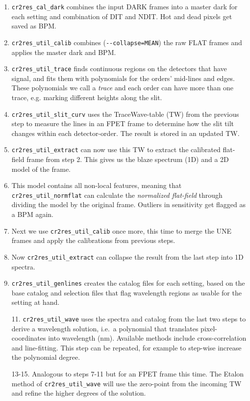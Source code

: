 \begin{enumerate}
    \item \texttt{cr2res\_cal\_dark} combines the input DARK frames into a
    master dark for each setting and combination of DIT and NDIT. Hot and dead
    pixels get saved as BPM.
    \item \texttt{cr2res\_util\_calib} combines (\verb!--collapse=MEAN!)
    the raw FLAT frames and applies the	master dark and BPM.
    \item \texttt{cr2res\_util\_trace} finds continuous regions on the detectors
    that have signal, and fits them with polynomials for the orders' mid-lines
    and edges. These polynomials we call a \emph{trace} and each order can have
    more than one trace, e.g. marking different heights along the slit.
    \item \texttt{cr2res\_util\_slit\_curv} uses the TraceWave-table (TW) from
    the previous step to measure the lines in an FPET frame to determine
    how the slit tilt changes within each detector-order. The result is stored
    in an updated TW.
    \item \texttt{cr2res\_util\_extract} can now use this TW to extract the
    calibrated flat-field frame from step 2. This gives us the blaze
    spectrum (1D) and a 2D model of the frame.
    \item This model contains all non-local features, meaning that
    \texttt{cr2res\_util\_normflat} can calculate the \emph{normalized
    flat-field} through dividing the model by the original frame. Outliers in
    sensitivity get flagged as a BPM again.
    \item Next we use \texttt{cr2res\_util\_calib} once more, this time to merge the UNE frames and apply the calibrations from previous steps.
    \item Now \texttt{cr2res\_util\_extract} can collapse the result from the last step into 1D spectra.
    \item \texttt{cr2res\_util\_genlines} creates the catalog files for each
    setting, based on the base catalog and selection files that flag wavelength
    regions as usable for the setting at hand.
    \item[11.] \texttt{cr2res\_util\_wave} uses the spectra and catalog from the
    last two steps to derive a wavelength solution, i.e.~a polynomial
    that translates pixel-coordinates into wavelength (nm). Available methods
    include cross-correlation and line-fitting. This step can be repeated, for
    example to step-wise increase the polynomial degree.
    \item[13-15.] Analogous to steps 7-11 but for an FPET frame this time. The
    Etalon method of \texttt{cr2res\_util\_wave} will use the zero-point from
    the incoming TW and refine the higher degrees of the solution.
\end{enumerate}
